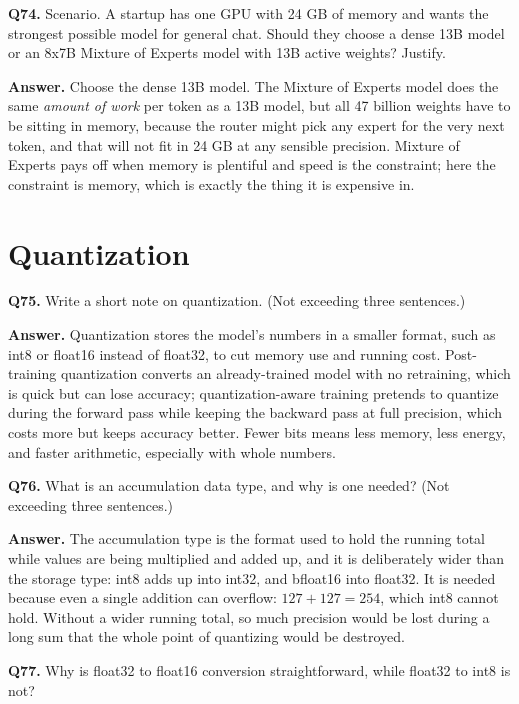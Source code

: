 \documentclass[11pt]{article}
\begin{document}
\medskip
\textbf{Q74.} Scenario. A startup has one GPU with 24 GB of memory and wants the strongest
possible model for general chat. Should they choose a dense 13B model or an 8x7B Mixture of
Experts model with 13B active weights? Justify.

\textbf{Answer.} Choose the dense 13B model. The Mixture of Experts model does the same
\emph{amount of work} per token as a 13B model, but all 47 billion weights have to be sitting
in memory, because the router might pick any expert for the very next token, and that will not
fit in 24 GB at any sensible precision. Mixture of Experts pays off when memory is plentiful
and speed is the constraint; here the constraint is memory, which is exactly the thing it is
expensive in.

\section{Quantization}

\textbf{Q75.} Write a short note on quantization. (Not exceeding three sentences.)

\textbf{Answer.} Quantization stores the model's numbers in a smaller format, such as int8 or
float16 instead of float32, to cut memory use and running cost. Post-training quantization
converts an already-trained model with no retraining, which is quick but can lose accuracy;
quantization-aware training pretends to quantize during the forward pass while keeping the
backward pass at full precision, which costs more but keeps accuracy better. Fewer bits means
less memory, less energy, and faster arithmetic, especially with whole numbers.

\medskip
\textbf{Q76.} What is an accumulation data type, and why is one needed? (Not exceeding three
sentences.)

\textbf{Answer.} The accumulation type is the format used to hold the running total while
values are being multiplied and added up, and it is deliberately wider than the storage type:
int8 adds up into int32, and bfloat16 into float32. It is needed because even a single
addition can overflow: $127+127=254$, which int8 cannot hold. Without a wider running total,
so much precision would be lost during a long sum that the whole point of quantizing would be
destroyed.

\medskip
\textbf{Q77.} Why is float32 to float16 conversion straightforward, while float32 to int8 is
not?
\end{document}
